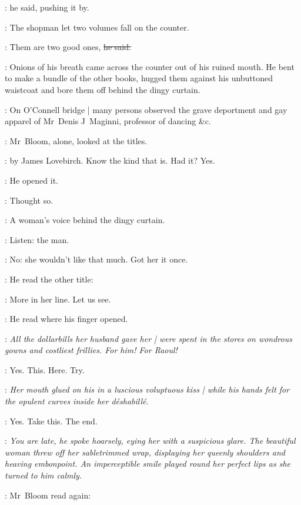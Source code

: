 :
he said,
pushing it by.

:
The shopman let two volumes fall on the counter.

\shopman:
Them are two good ones,
\sout{he said.}

:
Onions of his breath came across the counter
out of his ruined mouth.
He bent to make a bundle of the other books,
hugged them against his unbuttoned waistcoat
and bore them off behind the dingy curtain.

\begin{interject}
    :
    On O'Connell bridge |
    many persons observed the grave deportment
    and gay apparel of Mr~Denis J~Maginni,
    professor of dancing \&c.
\end{interject}%

:
Mr~Bloom, alone,
looked at the titles.

\BloomInt:
 by James Lovebirch.
Know the kind that is.
Had it?
Yes.

:
He opened it.

\BloomInt:
Thought so.

:
A woman's voice behind the dingy curtain.

\BloomInt:
Listen: the man.

\BloomInt:
No:
she wouldn't like that much.
Got her it once.

:
He read the other title:

\BloomInt:
More in her line.
Let us see.

:
He read where his finger opened.

\book:
\emph{All the dollarbills her husband gave her |
were spent in the stores
on wondrous gowns and costliest frillies.
For him!
For Raoul!}

\BloomInt:
Yes.
This.%
Here.
Try.

\book:
\emph{Her mouth glued on his in a luscious voluptuous kiss |
while his hands felt for the opulent curves inside her déshabillé.}

\BloomInt:
Yes.
Take this.
The end.

\book:
\emph{You are late,
he spoke hoarsely,
eying her with a suspicious glare.
The beautiful woman threw off her sabletrimmed wrap,
displaying her queenly shoulders and heaving embonpoint.
An imperceptible smile played round her perfect lips
as she turned to him calmly.}

:
Mr~Bloom read again:

